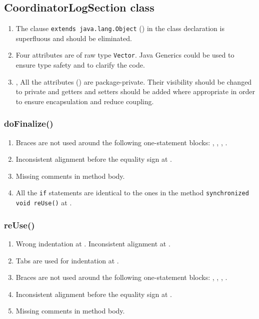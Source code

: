 \subsection{CoordinatorLogSection class}
\label{sec:coordinatorlogsection-class}

\begin{enumerate}
    \item The clause \texttt{extends java.lang.Object} () in the class declaration is superfluous and should be eliminated.
    \item {} Four attributes are of raw type \texttt{Vector}. Java Generics could be used to ensure type safety and to clarify the code.
    \item {},  All the attributes () are package-private. Their visibility should be changed to private and getters and setters should be added where appropriate in order to ensure encapsulation and reduce coupling.
\end{enumerate}

\subsubsection{doFinalize()}
\begin{enumerate}
    \item {} Braces are not used around the following one-statement blocks: , , , .
    \item {} Inconsistent alignment before the equality sign at .
    \item {} Missing comments in method body.
    \item {} All the \texttt{if} statements are identical to the ones in the method \texttt{synchronized void reUse()} at .
\end{enumerate}

\subsubsection{reUse()}
\begin{enumerate}
    \item {} Wrong indentation at . Inconsistent alignment at .
    \item {} Tabs are used for indentation at .
    \item {} Braces are not used around the following one-statement blocks: , , , .
    \item {} Inconsistent alignment before the equality sign at .
    \item {} Missing comments in method body.
\end{enumerate}

